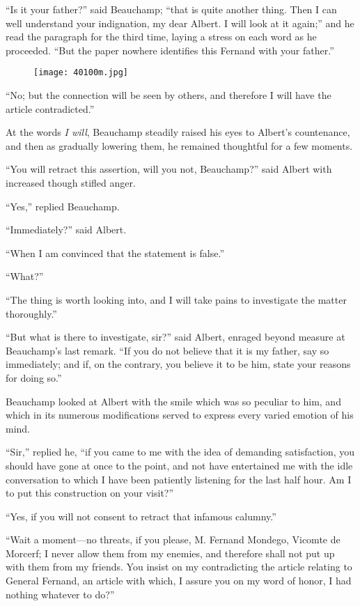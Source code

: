 “Is it your father?” said Beauchamp; “that is quite another thing. Then
I can well understand your indignation, my dear Albert. I will look at
it again;” and he read the paragraph for the third time, laying a
stress on each word as he proceeded. “But the paper nowhere identifies
this Fernand with your father.”

\begin{figure}[ht]
\texttt{[image: 40100m.jpg]}
\end{figure}

“No; but the connection will be seen by others, and therefore I will
have the article contradicted.”

At the words \textit{I will}, Beauchamp steadily raised his eyes to Albert’s
countenance, and then as gradually lowering them, he remained
thoughtful for a few moments.

“You will retract this assertion, will you not, Beauchamp?” said Albert
with increased though stifled anger.

“Yes,” replied Beauchamp.

“Immediately?” said Albert.

“When I am convinced that the statement is false.”

“What?”

“The thing is worth looking into, and I will take pains to investigate
the matter thoroughly.”

“But what is there to investigate, sir?” said Albert, enraged beyond
measure at Beauchamp’s last remark. “If you do not believe that it is
my father, say so immediately; and if, on the contrary, you believe it
to be him, state your reasons for doing so.”

Beauchamp looked at Albert with the smile which was so peculiar to him,
and which in its numerous modifications served to express every varied
emotion of his mind.

“Sir,” replied he, “if you came to me with the idea of demanding
satisfaction, you should have gone at once to the point, and not have
entertained me with the idle conversation to which I have been
patiently listening for the last half hour. Am I to put this
construction on your visit?”

“Yes, if you will not consent to retract that infamous calumny.”

“Wait a moment—no threats, if you please, M. Fernand Mondego, Vicomte
de Morcerf; I never allow them from my enemies, and therefore shall not
put up with them from my friends. You insist on my contradicting the
article relating to General Fernand, an article with which, I assure
you on my word of honor, I had nothing whatever to do?”

